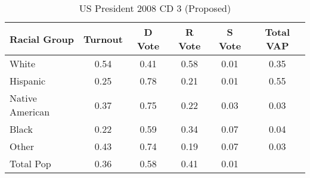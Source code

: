 \begin{table}[htb]
\begin{center}
\caption{US President 2008 CD 3 (Proposed)}
\label{pres08_vap_cd_3}
\begin{tabular}{lccccc}
  \hline
Racial Group & Turnout & D Vote & R Vote & S Vote & Total VAP \\ 
  \hline
White & 0.54 & 0.41 & 0.58 & 0.01 & 0.35 \\ 
  Hispanic & 0.25 & 0.78 & 0.21 & 0.01 & 0.55 \\ 
  Native American & 0.37 & 0.75 & 0.22 & 0.03 & 0.03 \\ 
  Black & 0.22 & 0.59 & 0.34 & 0.07 & 0.04 \\ 
  Other & 0.43 & 0.74 & 0.19 & 0.07 & 0.03 \\ 
  Total Pop & 0.36 & 0.58 & 0.41 & 0.01 &  \\ 
   \hline
\end{tabular}
\end{center}
\end{table}
